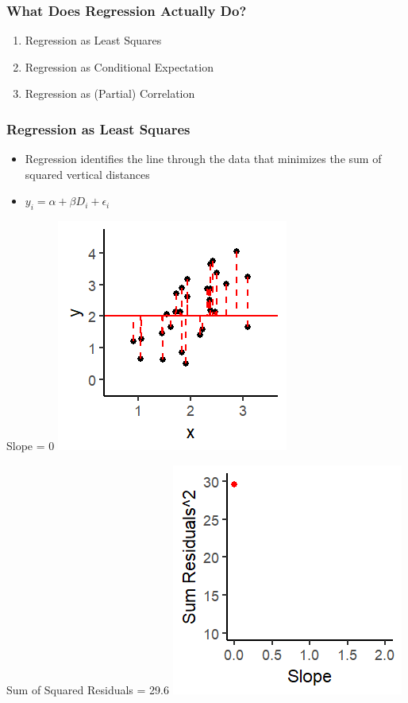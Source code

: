 \documentclass[xcolor=x11names,compress]{beamer}\usepackage[]{graphicx}\usepackage[]{color}
\makeatletter
\def\maxwidth{ %
  \ifdim\Gin@nat@width>\linewidth
    \linewidth
  \else
    \Gin@nat@width
  \fi
}
\newenvironment{knitrout}{}{} %
\renewcommand{\(}{\begin{columns}}
\renewcommand{\)}{\end{columns}}
\newcommand{\<}[1]{\begin{column}{#1}}
\renewcommand{\>}{\end{column}}
\makeatother
\begin{document}
\begin{frame}
\frametitle{What Does Regression Actually Do?}
\begin{enumerate}
\item Regression as Least Squares
\item Regression as Conditional Expectation
\item Regression as (Partial) Correlation
\end{enumerate}
\end{frame}


\begin{frame}
\frametitle{Regression as Least Squares}
\begin{itemize}
\item Regression identifies the line through the data that minimizes the sum of squared vertical distances 
\pause
\item $y_i = \alpha + \beta D_i + \epsilon_i$
\pause
\end{itemize}
\begin{multicols}{2}
Slope = 0
\begin{knitrout}
\color{fgcolor}
\includegraphics[width=\maxwidth]{figure/graph_ols1-1} 

\end{knitrout}
\columnbreak
Sum of Squared Residuals = 29.6
\begin{knitrout}
\color{fgcolor}
\includegraphics[width=\maxwidth]{figure/graph_ssr1-1} 

\end{knitrout}
\end{multicols}
\end{frame}
\end{document}

